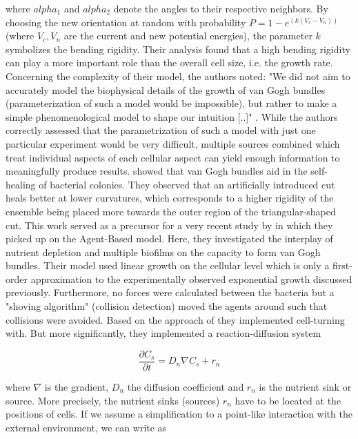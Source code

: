 \documentclass{article}
\begin{document}
where $alpha_1$ and $alpha_2$ denote the angles to their respective neighbors.
By choosing the new orientation at random with probability $P=1-e^(k(V_c-V_n))$ (where $V_c,V_n$ are
the current and new potential energies), the parameter $k$ symbolizes the bending rigidity.
Their analysis found that a high bending rigidity can play a more important role than the overall
cell size, i.e. the growth rate.
Concerning the complexity of their model, the authors noted:
"We did not aim to accurately model the biophysical details of the growth of van Gogh bundles
(parameterization of such a model would be impossible), but rather to make a simple phenomenological
model to shape our intuition [..]" \cite{vanGestel2015}.
While the authors correctly assessed that the parametrization of such a model with just one
particular experiment would be very difficult, multiple sources combined which treat individual
aspects of each cellular aspect can yield enough information to meaningfully produce results.
\cite{Dong2022} showed that van Gogh bundles aid in the self-healing of bacterial colonies.
They observed that an artificially introduced cut heals better at lower curvatures, which
corresponds to a higher rigidity of the ensemble being placed more towards the outer region of the
triangular-shaped cut.
This work served as a precursor for a very recent study by \cite{Li2025} in which they picked up on
the Agent-Based model.
Here, they investigated the interplay of nutrient depletion and multiple biofilms on the
capacity to form van Gogh bundles.
Their model used linear growth on the cellular level which is only a first-order approximation to
the experimentally observed exponential growth discussed previously.
Furthermore, no forces were calculated between the bacteria but a "shoving algorithm" (collision
detection) moved the agents around such that collisions were avoided.
Based on the approach of \cite{vanGestel2015} they implemented cell-turning with.
But more significantly, they implemented a reaction-diffusion system

\begin{equation}
    \frac{\partial C_s}{\partial t} = D_n \nabla C_s + r_n
\end{equation}

where $\nabla$ is the gradient, $D_n$ the diffusion coefficient and $r_n$ is the nutrient sink or
source.
More precisely, the nutrient sinks (sources) $r_n$ have to be located at the positions of cells.
If we assume a simplification to a point-like interaction with the external environment, we can
write as
\end{document}
